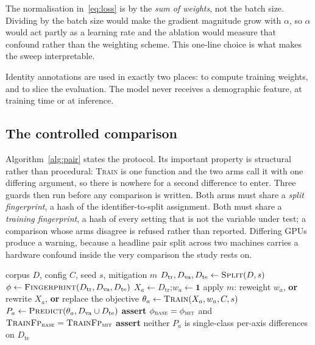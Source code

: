 \documentclass[conference]{IEEEtran}
\begin{document}
The normalisation in~\eqref{eq:loss} is by the \emph{sum of weights}, not the
batch size. Dividing by the batch size would make the gradient magnitude grow
with $\alpha$, so $\alpha$ would act partly as a learning rate and the ablation
would measure that confound rather than the weighting scheme. This one-line
choice is what makes the sweep interpretable.

Identity annotations are used in exactly two places: to compute training weights,
and to slice the evaluation. The model never receives a demographic feature, at
training time or at inference.

\subsection{The controlled comparison}
Algorithm~\ref{alg:pair} states the protocol. Its important property is
structural rather than procedural: \textsc{Train} is one function and the two
arms call it with one differing argument, so there is nowhere for a second
difference to enter. Three guards then run before any comparison is written.
Both arms must share a \emph{split fingerprint}, a hash of the
identifier-to-split assignment. Both must share a \emph{training fingerprint}, a
hash of every setting that is not the variable under test; a comparison whose
arms disagree is refused rather than reported. Differing GPUs produce a warning,
because a headline pair split across two machines carries a hardware confound
inside the very comparison the study rests on.

\begin{algorithm}[t]
\caption{The controlled pair}
\label{alg:pair}
\begin{algorithmic}[1]
\Require corpus $D$, config $C$, seed $s$, mitigation $m$
\State $D_{\text{tr}}, D_{\text{va}}, D_{\text{te}} \gets \textsc{Split}(D, s)$
\State $\phi \gets \textsc{Fingerprint}(D_{\text{tr}}, D_{\text{va}}, D_{\text{te}})$
  \State $X_a \gets D_{\text{tr}}$;\quad $w_a \gets \mathbf{1}$
    \State apply $m$: reweight $w_a$, \textbf{or} rewrite $X_a$,
    \Statex \hspace{1.9em} \textbf{or} replace the objective
  \EndIf
  \State $\theta_a \gets \textsc{Train}(X_a, w_a, C, s)$
  \State $P_a \gets \textsc{Predict}(\theta_a, D_{\text{va}} \cup D_{\text{te}})$
\EndFor
\State \textbf{assert} $\phi_{\textsc{base}} = \phi_{\textsc{mit}}$ and
  $\textsc{TrainFp}_{\textsc{base}} = \textsc{TrainFp}_{\textsc{mit}}$
\State \textbf{assert} neither $P_a$ is single-class
\State \Return per-axis differences on $D_{\text{te}}$
\end{algorithmic}
\end{algorithm}
\end{document}
